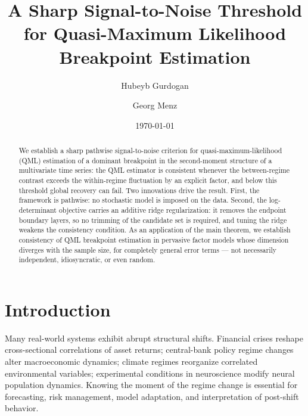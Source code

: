 \documentclass[10pt, letterpaper]{amsart}
\date{\today}
\begin{document}
\title[A Sharp SNR Threshold for QML Breakpoint Estimation]{A Sharp Signal-to-Noise Threshold for Quasi-Maximum Likelihood Breakpoint Estimation}

\author{Hubeyb Gurdogan}
\author{Georg Menz}



\begin{abstract}
We establish a sharp pathwise signal-to-noise criterion for quasi-maximum-likelihood (QML) estimation of a dominant breakpoint in the second-moment structure of a multivariate time series: the QML estimator is consistent whenever the between-regime contrast exceeds the within-regime fluctuation by an explicit factor, and below this threshold global recovery can fail. Two innovations drive the result. First, the framework is pathwise: no stochastic model is imposed on the data. Second, the log-determinant objective carries an additive ridge regularization: it removes the endpoint boundary layers, so no trimming of the candidate set is required, and tuning the ridge weakens the consistency condition. As an application of the main theorem, we establish consistency of QML breakpoint estimation in pervasive factor models whose dimension diverges with the sample size, for completely general error terms --- not necessarily independent, idiosyncratic, or even random.
\end{abstract}

\maketitle

\setcounter{tocdepth}{1}
\tableofcontents

\section{Introduction}\label{sec:intro}

Many real-world systems exhibit abrupt structural shifts. Financial crises reshape cross-sectional correlations of asset returns; central-bank policy regime changes alter macroeconomic dynamics; climate regimes reorganize correlated environmental variables; experimental conditions in neuroscience modify neural population dynamics. Knowing the moment of the regime change is essential for forecasting, risk management, model adaptation, and interpretation of post-shift behavior. \\
\end{document}
